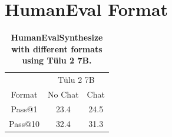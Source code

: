 \documentclass{article}
\newcommand{\tulu}{T\"ulu}
\begin{document}
\begin{table}[htbp]
\centering
\caption{\textbf{Benchmarking the benefit of an embedding instruction for generative instruction-tuned models.} When an instruction is used ("Mistral Instruct w/"), we use the default instructions from Instructor XL with the prompt template of the Mistral Instruct model. For no instruction ("Mistral Instruct w/o"), the procedure is the same as for the base model ("Mistral")
}
\end{table}

\FloatBarrier

\section{HumanEval Format}

\begin{table}
\vspace{-4em}
\caption{\textbf{HumanEvalSynthesize with different formats using \tulu{} 2 7B.}}
\begin{tabular}{c | c c}
\toprule
& \multicolumn{2}{c}{\tulu{} 2 7B} \\
Format & No Chat & Chat \\
\midrule
Pass@1 & 23.4 & 24.5 \\
Pass@10 & 32.4 & 31.3 \\
\bottomrule
\end{tabular}
\label{tab:humaneval}
\vspace{-0.79em}
\end{table}
\end{document}
